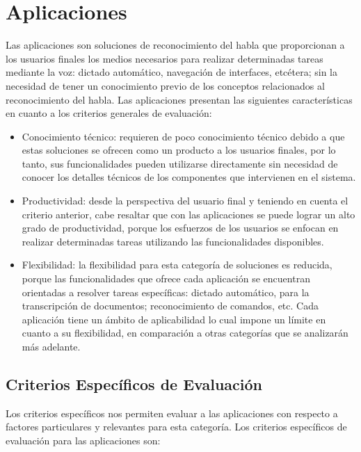 \section{Aplicaciones}
\label{sec:aplicaciones}

Las aplicaciones son soluciones de reconocimiento del habla que proporcionan
a los usuarios finales los medios necesarios para realizar determinadas tareas mediante
la voz: dictado autom\'atico, navegaci\'on de interfaces, etc\'etera; sin
la necesidad de tener un conocimiento previo de los conceptos relacionados al
reconocimiento del habla. Las aplicaciones presentan las siguientes 
caracter\'isticas en cuanto a los criterios generales de evaluaci\'on:

\begin{itemize}
    \item Conocimiento t\'ecnico: requieren de poco conocimiento  t\'ecnico debido a que estas
        soluciones se ofrecen como un producto a los usuarios finales, por lo tanto, sus funcionalidades
        pueden utilizarse directamente sin necesidad de conocer los detalles t\'ecnicos de
        los componentes que intervienen en el sistema.
    \item Productividad: desde la perspectiva del usuario final y teniendo en cuenta el criterio anterior, 
        cabe resaltar que con
        las aplicaciones se puede lograr un alto grado de productividad, porque los esfuerzos
        de los usuarios se enfocan en realizar determinadas tareas utilizando las funcionalidades
        disponibles.
    \item Flexibilidad: la flexibilidad para esta categor\'ia de soluciones es reducida, porque las
        funcionalidades que ofrece cada aplicaci\'on se encuentran orientadas a resolver tareas
        espec\'ificas: dictado autom\'atico, para la transcripci\'on de documentos; reconocimiento
        de comandos, etc. Cada aplicaci\'on tiene un \'ambito de aplicabilidad
        lo cual impone un l\'imite en cuanto a su flexibilidad, en comparaci\'on a otras categor\'ias que
        se analizarán m\'as adelante.
\end{itemize}

\subsection{Criterios Espec\'ificos de Evaluaci\'on}

Los criterios espec\'ificos nos permiten evaluar a las aplicaciones con respecto a factores
particulares y relevantes para esta categor\'ia. Los criterios 
espec\'ificos de evaluaci\'on para las aplicaciones son:

